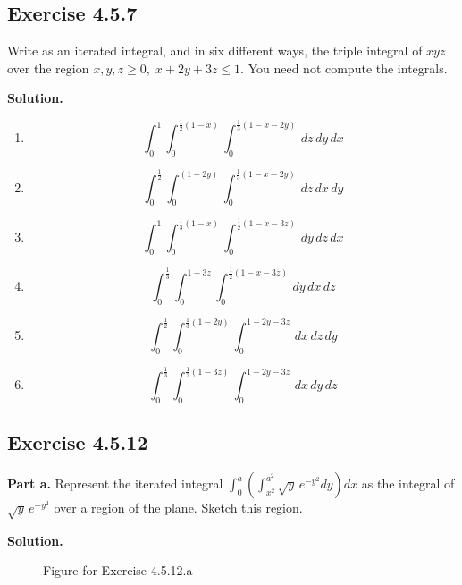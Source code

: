 \documentclass{article}
\begin{document}
\subsection*{Exercise 4.5.7}
Write as an iterated integral, and in six different ways, the triple integral of $xyz$ over the region $x, y, z \geq 0,\; x + 2y + 3z \leq 1$. You need not compute the integrals.
\medskip 

\textbf{Solution.}
\begin{enumerate}
    \item
    \[
        \int_{0}^{1} \int_{0}^{\frac{1}{2}(1-x)} \int_{0}^{\frac{1}{3}(1-x-2y)}  \,dz \,dy \,dx
    \]
    \item
    \[
        \int_{0}^{\frac{1}{2}} \int_{0}^{(1-2y)} \int_{0}^{\frac{1}{3}(1-x-2y)}  \,dz \,dx \,dy
    \]
    \item
    \[
        \int_{0}^{1} \int_{0}^{\frac{1}{3}(1-x)} \int_{0}^{\frac{1}{2}(1-x-3z)}  \,dy \,dz \,dx
    \]
    \item
    \[
        \int_{0}^{\frac{1}{3}} \int_{0}^{1-3z} \int_{0}^{\frac{1}{2}(1-x-3z)}  \,dy \,dx \,dz
    \]
    \item
    \[
        \int_{0}^{\frac{1}{2}} \int_{0}^{\frac{1}{3}(1-2y)} \int_{0}^{1-2y-3z}  \,dx \,dz \,dy
    \]
    \item
    \[
        \int_{0}^{\frac{1}{3}} \int_{0}^{\frac{1}{2}(1-3z)} \int_{0}^{1-2y-3z}  \,dx \,dy \,dz
    \]
\end{enumerate}
\newpage

\subsection*{Exercise 4.5.12}
\textbf{Part a.}
Represent the iterated integral $\displaystyle \int_0^a \left(\int_{x^2}^{a^2}\sqrt{y}\,e^{-y^2}dy\right) dx$ as the integral of $\sqrt{y}\,e^{-y^2}$ over a region of the plane. Sketch this region.
\medskip 

\textbf{Solution.}
\begin{figure}[ht!]
    \centering
{}
    \caption{Figure for Exercise 4.5.12.a}
    \label{fig:my_label 2}
\end{figure}
\bigskip
\end{document}
